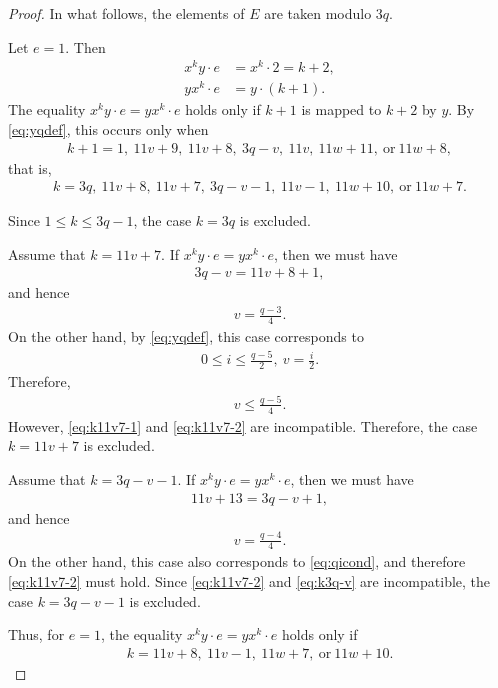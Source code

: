 \documentclass[12pt,reqno]{amsart}
\newcommand{\HL}{\vspace{2mm}}							%
\newcommand{\f}[2]{\frac{#1}{#2}}							%
\theoremstyle{mythmstyle}
\theoremstyle{mydefstyle}
\numberwithin{equation}{section}
\begin{document}
\begin{proof}
In what follows, the elements of $E$ are taken modulo $3q$.
\HL

\item[(i)] Let $e = 1$. Then
\begin{align}
x^{k}y\cdot e &= x^{k} \cdot 2 = k+2, \\
yx^{k}\cdot e &= y\cdot(k+1).
\end{align}
The equality $x^{k}y\cdot e = yx^{k}\cdot e$ holds only if
$k+1$ is mapped to $k+2$ by $y$. By \eqref{eq:yqdef}, this occurs only when
\begin{align}
k + 1 = 1,\ 11v+9,\ 11v+8,\ 3q-v,\ 11v,\ 11w+11,\ \text{or}\ 11w+8,
\end{align}
that is,
\begin{align}
k = 3q,\ 11v+8,\ 11v+7,\ 3q-v-1,\ 11v-1,\ 11w+10,\ \text{or}\ 11w+7.
\end{align}

Since $1 \le k \le 3q-1$, the case $k = 3q$ is excluded. 

Assume that $k = 11v+7$. If $x^{k}y\cdot e = yx^{k}\cdot e$,
then we must have
\begin{align}
3q - v = 11v+8+1,
\end{align}
and hence
\begin{align}
\label{eq:k11v7-1}
v = \f{q-3}{4}.
\end{align}
On the other hand, by \eqref{eq:yqdef}, this case corresponds to
\begin{align}
\label{eq:qicond}
0 \le i \le \f{q-5}{2},\ v = \f{i}{2}.
\end{align}
Therefore,
\begin{align}
\label{eq:k11v7-2}
v \le \f{q-5}{4}.
\end{align}
However, \eqref{eq:k11v7-1} and \eqref{eq:k11v7-2} are incompatible.
Therefore, the case $k = 11v+7$ is excluded.

Assume that $k = 3q-v-1$. If $x^{k}y\cdot e = yx^{k}\cdot e$,
then we must have
\begin{align}
11v+13 = 3q-v+1,
\end{align}
and hence
\begin{align}
\label{eq:k3q-v}
v = \f{q-4}{4}.
\end{align}
On the other hand, this case also corresponds to \eqref{eq:qicond}, and therefore
\eqref{eq:k11v7-2} must hold. Since \eqref{eq:k11v7-2} and \eqref{eq:k3q-v} are incompatible,
the case $k = 3q-v-1$ is excluded.

Thus, for $e = 1$, the equality $x^{k}y\cdot e = yx^{k}\cdot e$ holds only if
\begin{align}
\label{eq:ke1}
k = 11v+8,\ 11v-1,\ 11w+7,\ \text{or}\ 11w+10.
\end{align}


\end{proof}
\end{document}
